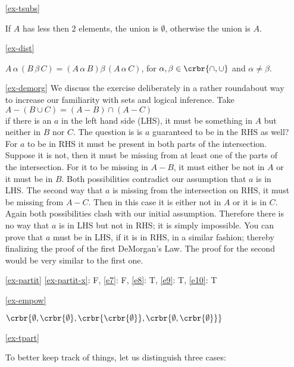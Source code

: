 \documentclass[11pt]{article}
\begin{document}
\begin{enumerate}
\item[\ref{ex-tsubs}]\hypertarget{ex-tsubs-sol}{}

If $A$ has less then 2 elements, the union is $\emptyset$, otherwise the union
is $A$.

\item[\ref{ex-dist}]\hypertarget{ex-dist-sol}{}

$A\,\alpha\, (B\, \beta\, C) = (A\,\alpha\, B) \beta\, (A\,\alpha\, C)$, for
$\alpha, \beta \in \crbr{\cap,\cup}$ and $\alpha\neq\beta$.

\item[\ref{ex-demorg}]\hypertarget{ex-demorg-sol}{}
We discuss the exercise deliberately in a rather
roundabout way to increase our familiarity with sets and logical inference. Take\\
$A - (B\cup C) = (A-B) \cap (A-C)$\\
if there is an $a$ in the left hand side (LHS), it must be something in $A$ but
neither in $B$ nor $C$. The question is is $a$ guaranteed to be in the RHS as
well? For $a$ to be in RHS it must be present in both parts of the intersection.
Suppose it is not, then it must be missing from at least one of the parts of the
intersection. For it to be missing in $A - B$, it must either be not in $A$ or
it must be in $B$. Both possibilities contradict our assumption that $a$ is in
LHS. The second way that $a$ is missing from the intersection on RHS, it must be
missing from $A - C$. Then in this case it is either not in $A$ or it is in $C$.
Again both possibilities clash with our initial assumption. Therefore there is
no way that $a$ is in LHS but not in RHS; it is simply impossible. You can prove
that $a$ must be in LHS, if it is in RHS, in a similar fashion; thereby
finalizing the proof of the first DeMorgan's Law. The proof for the second
would be very similar to the first one. 

\item[\ref{ex-partit}]\hypertarget{ex-partit-sol}{}
\ref{ex-partit-x}: F,
\ref{e7}: F, 
\ref{e8}: T, 
\ref{e9}: T, 
\ref{e10}: T 


\item[\ref{ex-empow}]\hypertarget{ex-empow-sol}{}

$\crbr{\emptyset,
\crbr{\emptyset},
\crbr{\crbr{\emptyset}},
\crbr{\emptyset,\crbr{\emptyset}}}$


\item[\ref{ex-tpart}]\hypertarget{ex-tpart-sol}{}

To better keep track of things, let us distinguish three cases:


\end{enumerate}
\end{document}
